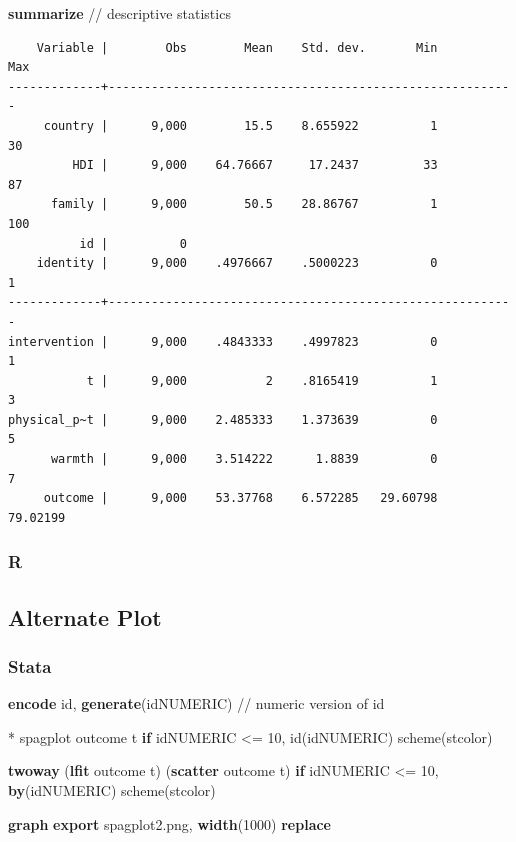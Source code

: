 \documentclass[
  letterpaper,
  DIV=11,
  numbers=noendperiod]{scrreprt}
\newenvironment{Shaded}{\begin{snugshade}}{\end{snugshade}}
\newcommand{\CommentTok}[1]{\textcolor[rgb]{0.37,0.37,0.37}{#1}}
\newcommand{\DecValTok}[1]{\textcolor[rgb]{0.68,0.00,0.00}{#1}}
\newcommand{\KeywordTok}[1]{\textcolor[rgb]{0.00,0.23,0.31}{\textbf{#1}}}
\newcommand{\NormalTok}[1]{\textcolor[rgb]{0.00,0.23,0.31}{#1}}
\begin{document}
\begin{Shaded}
\begin{Highlighting}[]

\KeywordTok{summarize} \CommentTok{// descriptive statistics}
\end{Highlighting}
\end{Shaded}

\begin{verbatim}
    Variable |        Obs        Mean    Std. dev.       Min        Max
-------------+---------------------------------------------------------
     country |      9,000        15.5    8.655922          1         30
         HDI |      9,000    64.76667     17.2437         33         87
      family |      9,000        50.5    28.86767          1        100
          id |          0
    identity |      9,000    .4976667    .5000223          0          1
-------------+---------------------------------------------------------
intervention |      9,000    .4843333    .4997823          0          1
           t |      9,000           2    .8165419          1          3
physical_p~t |      9,000    2.485333    1.373639          0          5
      warmth |      9,000    3.514222      1.8839          0          7
     outcome |      9,000    53.37768    6.572285   29.60798   79.02199
\end{verbatim}

\subsubsection{R}

\subsection{Alternate Plot}\label{alternate-plot}

\subsubsection{Stata}

\begin{Shaded}
\begin{Highlighting}[]
\KeywordTok{encode}\NormalTok{ id, }\KeywordTok{generate}\NormalTok{(idNUMERIC) }\CommentTok{// numeric version of id}
    
\NormalTok{* spagplot outcome t }\KeywordTok{if}\NormalTok{ idNUMERIC \textless{}= 10, id(idNUMERIC) }\DecValTok{scheme}\NormalTok{(stcolor)}
    
\KeywordTok{twoway}\NormalTok{ (}\KeywordTok{lfit}\NormalTok{ outcome t) (}\KeywordTok{scatter}\NormalTok{ outcome t) }\KeywordTok{if}\NormalTok{ idNUMERIC \textless{}= 10, }\KeywordTok{by}\NormalTok{(idNUMERIC) }\DecValTok{scheme}\NormalTok{(stcolor)}

\KeywordTok{graph} \KeywordTok{export}\NormalTok{ spagplot2.png, }\KeywordTok{width}\NormalTok{(1000) }\KeywordTok{replace}
\end{Highlighting}
\end{Shaded}
\end{document}

